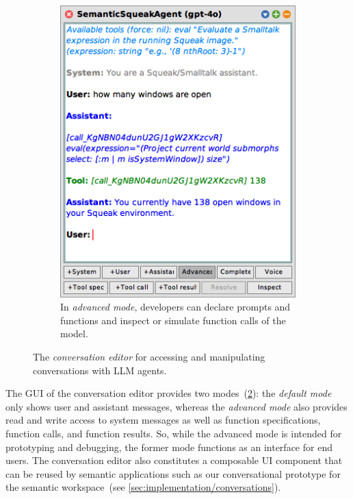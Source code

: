 \begin{figure}[t]
\begin{subfigure}[t]{0.5\dimexpr\textwidth-1em\relax}
        \includegraphics[width=\textwidth]{03_tools/editor/advanced.png}
        \caption{In \emph{advanced mode}, developers can declare prompts and functions and inspect or simulate function calls of the model.}
        \label{fig:semtex/tools/editor/advanced}
    \end{subfigure}
	\caption[The \emph{conversation editor} for accessing and manipulating conversations with LLM agents.]{
		The \emph{conversation editor} for accessing and manipulating conversations with LLM agents.
	}
	\label{fig:semtex/tools/editor}
\end{figure}

The GUI of the conversation editor provides two modes~(\cref{fig:semtex/tools/editor}):
the \emph{default mode} only shows user and assistant messages, whereas the \emph{advanced mode} also provides read and write access to system messages as well as function specifications, function calls, and function results.
So, while the advanced mode is intended for prototyping and debugging, the former mode functions as an interface for end users.
The conversation editor also constitutes a composable UI component that can be reused by semantic applications such as our conversational prototype for the semantic workspace~(see \cref{sec:implementation/conversations}).

